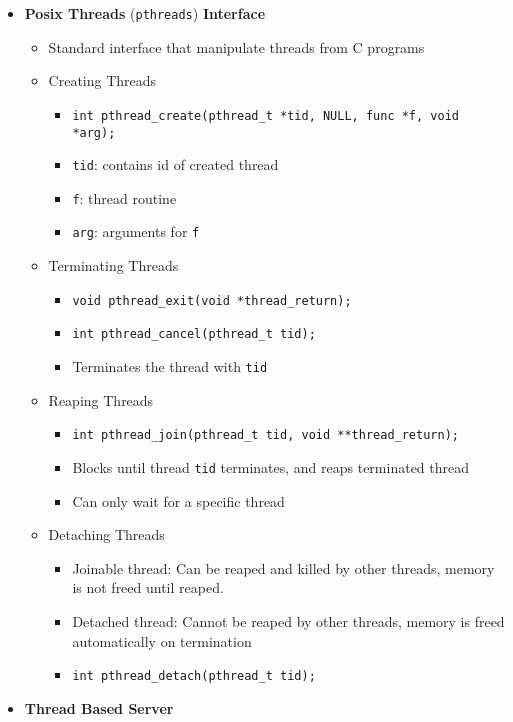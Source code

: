 \documentclass[12pt]{article}
\begin{document}
{\begin{itemize}
\begin{itemize}
	\end{itemize}
	\item \textbf{Posix Threads} (\texttt{pthreads}) \textbf{Interface}
	\begin{itemize}
		\item Standard interface that manipulate threads from C programs
		\item Creating Threads
		\begin{itemize}
			\item \texttt{int pthread\_create(pthread\_t *tid, NULL, func *f, void *arg);}
			\item \texttt{tid}: contains id of created thread
			\item \texttt{f}: thread routine
			\item \texttt{arg}: arguments for \texttt{f}
		\end{itemize}
		\item Terminating Threads
		\begin{itemize}
			\item \texttt{void pthread\_exit(void *thread\_return);}
			\item \texttt{int pthread\_cancel(pthread\_t tid);}
			\item Terminates the thread with \texttt{tid}
		\end{itemize}
		\item Reaping Threads
		\begin{itemize}
			\item \texttt{int pthread\_join(pthread\_t tid, void **thread\_return);}
			\item Blocks until thread \texttt{tid} terminates, and reaps terminated thread
			\item Can only wait for a specific thread
		\end{itemize}
		\item Detaching Threads
		\begin{itemize}
			\item Joinable thread: Can be reaped and killed by other threads, memory is not freed until reaped.
			\item Detached thread: Cannot be reaped by other threads, memory is freed automatically on termination
			\item \texttt{int pthread\_detach(pthread\_t tid);}
		\end{itemize}
	\end{itemize}
	\item \textbf{Thread Based Server}
	\begin{itemize}

\end{itemize}
\end{itemize}}
\end{document}
